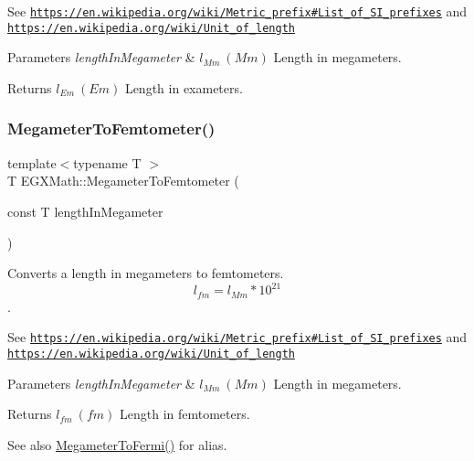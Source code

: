 See \href{https://en.wikipedia.org/wiki/Metric_prefix#List_of_SI_prefixes}{\tt https\+://en.\+wikipedia.\+org/wiki/\+Metric\+\_\+prefix\#\+List\+\_\+of\+\_\+\+S\+I\+\_\+prefixes} and \href{https://en.wikipedia.org/wiki/Unit_of_length}{\tt https\+://en.\+wikipedia.\+org/wiki/\+Unit\+\_\+of\+\_\+length} 
\begin{DoxyParams}{Parameters}
{\em length\+In\+Megameter} & $ l_{Mm}\ (Mm)$ Length in megameters. \\
\hline
\end{DoxyParams}
\begin{DoxyReturn}{Returns}
$ l_{Em}\ (Em)$ Length in exameters. 
\end{DoxyReturn}
\mbox{\label{group___e_g_x_math-_conversions-_length_conversions-_s_i-_megameter-_s_i_gad53a3da18100c2bb2d12ecb9178ae597}} 
\subsubsection{\texorpdfstring{Megameter\+To\+Femtometer()}{MegameterToFemtometer()}}
{\footnotesize\ttfamily template$<$typename T $>$ \\
T E\+G\+X\+Math\+::\+Megameter\+To\+Femtometer (\begin{DoxyParamCaption}\item[{const T}]{length\+In\+Megameter }\end{DoxyParamCaption})}



Converts a length in megameters to femtometers. \[ l_{fm}=l_{Mm} * 10^{21} \]. 

See \href{https://en.wikipedia.org/wiki/Metric_prefix#List_of_SI_prefixes}{\tt https\+://en.\+wikipedia.\+org/wiki/\+Metric\+\_\+prefix\#\+List\+\_\+of\+\_\+\+S\+I\+\_\+prefixes} and \href{https://en.wikipedia.org/wiki/Unit_of_length}{\tt https\+://en.\+wikipedia.\+org/wiki/\+Unit\+\_\+of\+\_\+length} 
\begin{DoxyParams}{Parameters}
{\em length\+In\+Megameter} & $ l_{Mm}\ (Mm)$ Length in megameters. \\
\hline
\end{DoxyParams}
\begin{DoxyReturn}{Returns}
$ l_{fm}\ (fm)$ Length in femtometers. 
\end{DoxyReturn}
\begin{DoxySeeAlso}{See also}
\mbox{\hyperlink{group___e_g_x_math-_conversions-_length_conversions-_s_i-_megameter-_non-_s_i_ga74f07a7c24ffe784415fb3d33a3b5bec}{Megameter\+To\+Fermi()}} for alias. 
\end{DoxySeeAlso}
\mbox{\label{group___e_g_x_math-_conversions-_length_conversions-_s_i-_megameter-_s_i_gaa59e3194a054aeb6623886f72e245103}} 
